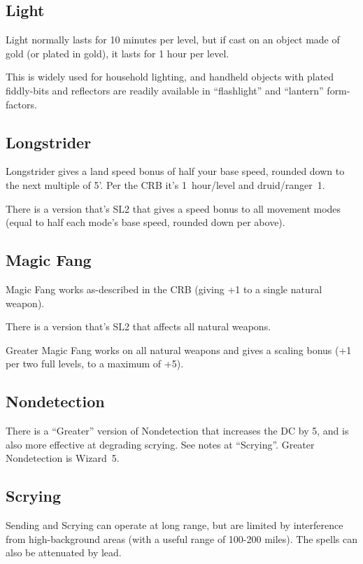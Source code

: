 %
\subsection{Light}

Light normally lasts for 10 minutes per level, but if cast on an object
made of gold (or plated in gold), it lasts for 1 hour per level.

This is widely used for household lighting, and handheld objects with
plated fiddly-bits and reflectors are readily available in ``flashlight''
and ``lantern'' form-factors.
%

%
\subsection{Longstrider}

Longstrider gives a land speed bonus of half your base speed, rounded down
to the next multiple of 5'. Per the CRB it's 1~hour/level and
druid/ranger~1.

There is a version that's SL2 that gives a speed bonus to all movement
modes (equal to half each mode's base speed, rounded down per above).
%

%
\subsection{Magic Fang}

Magic Fang works as-described in the CRB (giving +1 to a single natural
weapon).

There is a version that's SL2 that affects all natural weapons.

Greater Magic Fang works on all natural weapons and gives a scaling bonus
(+1 per two full levels, to a maximum of +5).
%

%
\subsection{Nondetection}

There is a ``Greater'' version of Nondetection that increases the DC by
5, and is also more effective at degrading scrying. See notes at
``Scrying''. Greater Nondetection is Wizard~5.
%

%
\subsection{Scrying}

Sending and Scrying can operate at long range, but are limited by
interference from high-background areas (with a useful range of 100-200
miles). The spells can also be attenuated by lead.

